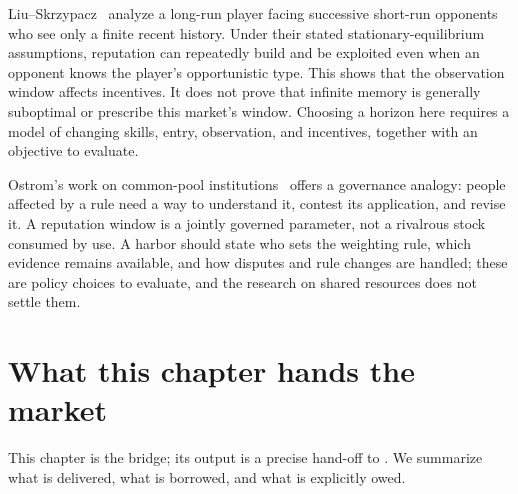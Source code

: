 \documentclass[11pt,a4paper]{article}
\theoremstyle{definition}
\begin{document}
Liu--Skrzypacz~ analyze a long-run player facing successive
short-run opponents who see only a finite recent history. Under their stated
stationary-equilibrium assumptions, reputation can repeatedly build and be
exploited even when an opponent knows the player's opportunistic type. This
shows that the observation window affects incentives. It does not prove that
infinite memory is generally suboptimal or prescribe this market's window.
Choosing a horizon here requires a model of changing skills, entry, observation,
and incentives, together with an objective to evaluate.

Ostrom's work on common-pool institutions~ offers a governance
analogy: people affected by a rule need a way to understand it, contest its
application, and revise it. A reputation window is a jointly governed
parameter, not a rivalrous stock consumed by use. A harbor should state who
sets the weighting rule, which evidence remains available, and how disputes
and rule changes are handled; these are policy choices to evaluate, and the
research on shared resources does not settle them.



\pdexercisepointer{\ref{ex:stp-tombstone-vs-delete}}{\ref{ex:stp-revocation-convergence}}{\pageref{ex:stp-tombstone-vs-delete}}

\section{What this chapter hands the market}\label{sec:handoff}

This chapter is the bridge; its output is a precise hand-off to . We summarize what is delivered, what is borrowed, and what is
explicitly owed.
\end{document}
